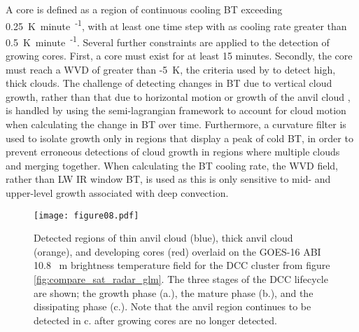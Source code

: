 A core is defined as a region of continuous cooling BT exceeding 0.25~\unit{K minute\textsuperscript{-1}}, with at least one time step with as cooling rate greater than 0.5~\unit{K minute\textsuperscript{-1}}.
Several further constraints are applied to the detection of growing cores.
First, a core must exist for at least 15 minutes.
Secondly, the core must reach a WVD of greater than -5~\unit{K}, the criteria used by \citet{muller_role_2018} to detect high, thick clouds.
The challenge of detecting changes in BT due to vertical cloud growth, rather than that due to horizontal motion or growth of the anvil cloud \citep{hartung_intercomparison_2013}, is handled by using the semi-lagrangian framework to account for cloud motion when calculating the change in BT over time.
Furthermore, a curvature filter is used to isolate growth only in regions that display a peak of cold BT, in order to prevent erroneous detections of cloud growth in regions where multiple clouds and merging together.
When calculating the BT cooling rate, the WVD field, rather than LW IR window BT, is used as this is only sensitive to mid- and upper-level growth associated with deep convection.

\begin{figure}[t]
    \centering
    \texttt{[image: figure08.pdf]}
    \caption{Detected regions of thin anvil cloud (blue), thick anvil cloud (orange), and developing cores (red) overlaid on the GOES-16 ABI 10.8 \unit{\mu m} brightness temperature field for the DCC cluster from figure \ref{fig:compare_sat_radar_glm}. The three stages of the DCC lifecycle are shown; the growth phase (a.), the mature phase (b.), and the dissipating phase (c.). Note that the anvil region continues to be detected in c. after growing cores are no longer detected.}
    \label{fig:detected_anvils}
\end{figure}

